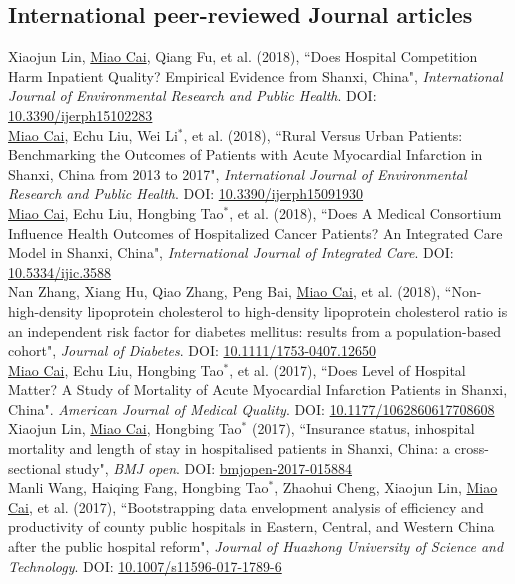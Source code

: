 \documentclass[11pt, a4paper]{article}
\newcommand{\years}[1]{\marginnote{\scriptsize #1}}
\begin{document}
\subsection*{International peer-reviewed Journal articles}
\noindent
\years{2018}Xiaojun Lin, \underline{Miao Cai}, Qiang Fu, et al. (2018), ``Does Hospital Competition Harm Inpatient Quality? Empirical Evidence from Shanxi, China", \emph{International Journal of Environmental Research and Public Health}. DOI: \href{https://doi.org/10.3390/ijerph15102283}{10.3390/ijerph15102283}\\
\years{2018}\underline{Miao Cai}, Echu Liu, Wei Li$^\ast$, et al. (2018), ``Rural Versus Urban Patients: Benchmarking the Outcomes of Patients with Acute Myocardial Infarction in Shanxi, China from 2013 to 2017", \emph{International Journal of Environmental Research and Public Health}. DOI: \href{https://doi.org/10.3390/ijerph15091930}{10.3390/ijerph15091930}\\
\years{2018}\underline{Miao Cai}, Echu Liu, Hongbing Tao$^\ast$, et al. (2018), ``Does A Medical Consortium Influence Health Outcomes of Hospitalized Cancer Patients? An Integrated Care Model in Shanxi, China", \emph{International Journal of Integrated Care}. DOI: \href{https://doi.org/10.5334/ijic.3588}{10.5334/ijic.3588}\\
\years{2018}Nan Zhang, Xiang Hu, Qiao Zhang, Peng Bai, \underline{Miao Cai}, et al. (2018), ``Non-high-density lipoprotein cholesterol to high-density lipoprotein cholesterol ratio is an independent risk factor for diabetes mellitus: results from a population-based cohort", \emph{Journal of Diabetes}. DOI: \href{https://doi.org/10.1111/1753-0407.12650}{10.1111/1753-0407.12650}\\
\years{2017}\underline{Miao Cai}, Echu Liu, Hongbing Tao$^\ast$, et al. (2017), ``Does Level of Hospital Matter? A Study of Mortality of Acute Myocardial Infarction Patients in Shanxi, China". \emph{American Journal of Medical Quality}. DOI: \href{https://doi.org/10.1177/1062860617708608}{10.1177/1062860617708608}\\
\years{2017}Xiaojun Lin, \underline{Miao Cai}, Hongbing Tao$^\ast$ (2017), ``Insurance status, inhospital mortality and length of stay in hospitalised patients in Shanxi, China: a cross-sectional study", \emph{BMJ open}. DOI: \href{https://doi.org/10.1136/bmjopen-2017-015884}{bmjopen-2017-015884}\\
\years{2017}Manli Wang, Haiqing Fang, Hongbing Tao$^\ast$, Zhaohui Cheng, Xiaojun Lin, \underline{Miao Cai}, et al. (2017), ``Bootstrapping data envelopment analysis of efficiency and productivity of county public hospitals in Eastern, Central, and Western China after the public hospital reform", \emph{Journal of Huazhong University of Science and Technology}. DOI: \href{https://doi.org/10.1007/s11596-017-1789-6}{10.1007/s11596-017-1789-6}\\
\end{document}
